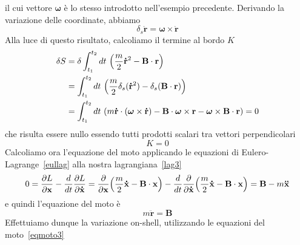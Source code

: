 \begin{example}
        il cui vettore $\boldsymbol \omega$ è lo stesso introdotto nell'esempio precedente. Derivando la variazione delle coordinate, abbiamo
    \begin{equation*}
        \delta_s \mathbf{\dot r} = \boldsymbol \omega \times \mathbf{\dot r}
    \end{equation*}
        Alla luce di questo risultato, calcoliamo il termine al bordo $K$ 
    \begin{equation*}
    \begin{aligned}
        \delta S & = \delta \int_{t_1}^{t_2}dt~ \Big( \frac{m}{2} \mathbf{\dot r}^2 - \mathbf B \cdot \mathbf r \Big) \\ & = \int_{t_1}^{t_2}dt~ \Big( \frac{m}{2} \delta_s (\mathbf{\dot r}^2) - \delta_s (\mathbf B \cdot \mathbf r ) \Big ) \\ & = \int_{t_1}^{t_2}dt~ (m \mathbf{\dot r} \cdot (\boldsymbol \omega \times \mathbf{\dot r} ) - \mathbf B \cdot \boldsymbol \omega \times \mathbf r - \boldsymbol \omega \times \mathbf B \cdot \mathbf r ) = 0
    \end{aligned}
    \end{equation*}
        che risulta essere nullo essendo tutti prodotti scalari tra vettori perpendicolari
    \begin{equation*}
        K = 0
    \end{equation*}
        Calcoliamo ora l'equazione del moto applicando le equazioni di Eulero-Lagrange~\eqref{eullag} alla nostra lagrangiana~\eqref{lag3}
    \begin{equation*}
        0 = \frac{\partial L}{\partial\mathbf x} - \frac{d}{dt} \frac{\partial L}{\partial\mathbf{\dot x}} = \frac{\partial}{\partial\mathbf x} \Big(\frac{m}{2} \mathbf{\dot x} - \mathbf B \cdot \mathbf x \Big) - \frac{d}{dt} \frac{\partial}{\partial\mathbf{\dot x}} \Big(\frac{m}{2} \mathbf{\dot x} - \mathbf B \cdot \mathbf x \Big) = \mathbf B - m \mathbf{\ddot x}
    \end{equation*}
        e quindi l'equazione del moto è
    \begin{equation}\label{eqmoto3}
        m \mathbf{\ddot r} = \mathbf B
    \end{equation}
        Effettuiamo dunque la variazione on-shell, utilizzando le equazioni del moto~\eqref{eqmoto3}
    \begin{equation*}
    \begin{aligned}

\end{aligned}
\end{equation*}
\end{example}
